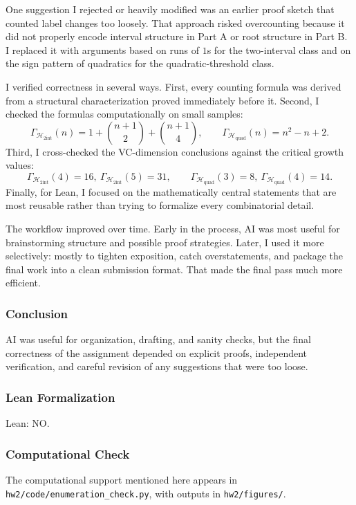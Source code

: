 \documentclass{article}
\newcommand{\growth}{\Gamma}
\newcommand{\classA}{\mathcal{H}_{2\mathrm{int}}}
\newcommand{\classB}{\mathcal{H}_{\mathrm{quad}}}
\begin{document}
\begin{solutionbox}
One suggestion I rejected or heavily modified was an earlier proof sketch that
counted label changes too loosely. That approach risked overcounting because it
did not properly encode interval structure in Part A or root structure in Part
B. I replaced it with arguments based on runs of \(1\)s for the two-interval
class and on the sign pattern of quadratics for the quadratic-threshold class.

I verified correctness in several ways. First, every counting formula was
derived from a structural characterization proved immediately before it. Second,
I checked the formulas computationally on small samples:
\[
\growth_{\classA}(n)=1+\binom{n+1}{2}+\binom{n+1}{4},
\qquad
\growth_{\classB}(n)=n^2-n+2.
\]
Third, I cross-checked the VC-dimension conclusions against the critical growth
values:
\[
\growth_{\classA}(4)=16,\ \growth_{\classA}(5)=31,
\qquad
\growth_{\classB}(3)=8,\ \growth_{\classB}(4)=14.
\]
Finally, for Lean, I focused on the mathematically central statements that are
most reusable rather than trying to formalize every combinatorial detail.

The workflow improved over time. Early in the process, AI was most useful for
brainstorming structure and possible proof strategies. Later, I used it more
selectively: mostly to tighten exposition, catch overstatements, and package the
final work into a clean submission format. That made the final pass much more
efficient.

\subsubsection{Conclusion}

AI was useful for organization, drafting, and sanity checks, but the final
correctness of the assignment depended on explicit proofs, independent
verification, and careful revision of any suggestions that were too loose.

\subsubsection{Lean Formalization}

Lean: NO.

\subsubsection{Computational Check}

The computational support mentioned here appears in
\texttt{hw2/code/enumeration\_check.py}, with outputs in \texttt{hw2/figures/}.

\end{solutionbox}
\end{document}
